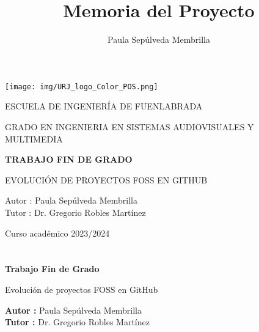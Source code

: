 \documentclass[a4paper, 12pt]{book}
\title{Memoria del Proyecto}
\author{Paula Sepúlveda Membrilla}
\begin{document}
\renewcommand{\refname}{Bibliografía}  %
\renewcommand{\appendixname}{Apéndice}



\begin{titlepage}
\begin{center}
\texttt{[image: img/URJ\_logo\_Color\_POS.png]}

\vspace{1.75cm}

\LARGE
ESCUELA DE INGENIERÍA DE FUENLABRADA
\vspace{1cm}

\LARGE
GRADO EN INGENIERIA EN SISTEMAS AUDIOVISUALES Y MULTIMEDIA

\vspace{1cm}
\LARGE
\textbf{TRABAJO FIN DE GRADO}

\vspace{2cm}

\Large
EVOLUCIÓN DE PROYECTOS FOSS EN GITHUB

\vspace{2cm}

\large
Autor : Paula Sepúlveda Membrilla \\
Tutor : Dr. Gregorio Robles Martínez\\
\vspace{1cm}

\large
Curso académico 2023/2024

\end{center}
\end{titlepage}

\newpage
\mbox{}
\thispagestyle{empty} %



\clearpage
{}
\chapter*{}

\vspace{-4cm}
\begin{center}
\LARGE
\textbf{Trabajo Fin de Grado}

\vspace{1cm}
\large
Evolución de proyectos FOSS en GitHub

\vspace{1cm}
\large
\textbf{Autor :} Paula Sepúlveda Membrilla \\
\textbf{Tutor :} Dr. Gregorio Robles Martínez
\end{center}
\end{document}
